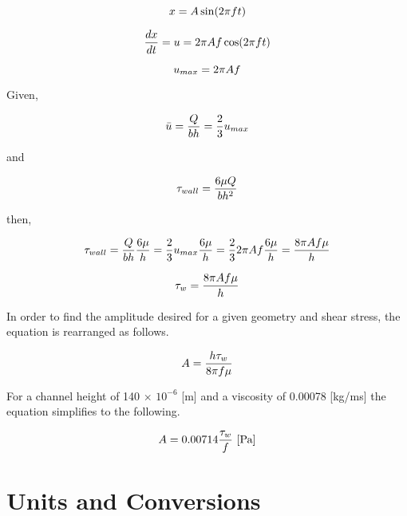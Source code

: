 \begin{equation}
\centering
x=A \sin (2\pi f t)
\label{equ:amp}
\end{equation}

\begin{equation}
\centering
\frac{dx}{dt} = u = 2 \pi A f \cos (2\pi f t)
\label{equ:dxdt}
\end{equation}

\begin{equation}
\centering
u_{max} = 2 \pi A f
\label{equ:umax}
\end{equation}

Given,

\begin{equation}
\centering
\bar u = \frac{Q}{bh} = \frac{2}{3}u_{max}
\label{equ:ubar2}
\end{equation}

and

\begin{equation}
\centering
\tau_{wall} = \frac{6\mu Q}{bh^{2}}
\label{equ:tauWall2}
\end{equation}


then,

\begin{equation}
\centering
\tau_{wall} = \frac{Q}{bh}\frac{6\mu}{h} = \frac{2}{3}u_{max}\frac{6\mu}{h} = \frac{2}{3}2 \pi A f \frac{6\mu}{h} = \frac{8 \pi A f \mu}{h}
\label{equ:tauWall3}
\end{equation}

\begin{equation}
\centering
\tau_{w}= \frac{8 \pi A f \mu}{h}
\label{equ:tauWall4}
\end{equation}

In order to find the amplitude desired for a given geometry and shear stress, the equation is rearranged as follows.

\begin{equation}
\centering
A = \frac{h \tau_{w}}{8 \pi f \mu}
\end{equation}

For a channel height of 140 $\times$ $10^{-6}$ [m] and a viscosity of 0.00078 [kg/ms] the equation simplifies to the following.

\begin{equation}
\centering
A = 0.00714 \frac{\tau_{w}}{f} \textrm{ [Pa]}
\end{equation}

\section{Units and Conversions}

